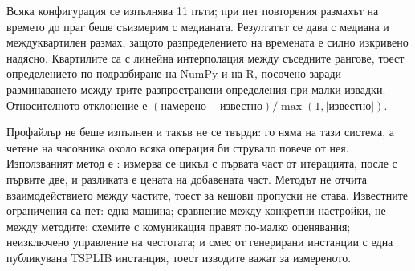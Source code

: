 Всяка конфигурация се изпълнява 11 пъти; при пет повторения размахът на времето до праг беше съизмерим
с медианата. Резултатът се дава с медиана и междуквартилен
размах, защото разпределението на времената е силно изкривено надясно. Квартилите са с линейна
интерполация между съседните рангове, тоест определението по подразбиране на NumPy и на R, посочено
заради разминаването между трите разпространени определения при малки извадки. Относителното
отклонение е $(\text{намерено} - \text{известно}) / \max(1, |\text{известно}|)$.

Профайлър не беше изпълнен и такъв не се твърди:  го няма на тази система, а четене на
часовника около всяка операция би струвало повече от нея. Използваният метод е : измерва
се цикъл с първата част от итерацията, после с първите две, и разликата е цената на добавената част.
Методът не отчита взаимодействието между частите, тоест за кешови пропуски не става. Известните
ограничения са пет: една машина; сравнение между конкретни настройки, не между методите; схемите с
комуникация правят по-малко оценявания; неизключено управление на честотата; и смес от генерирани
инстанции с една публикувана TSPLIB инстанция, тоест изводите важат за измереното.

